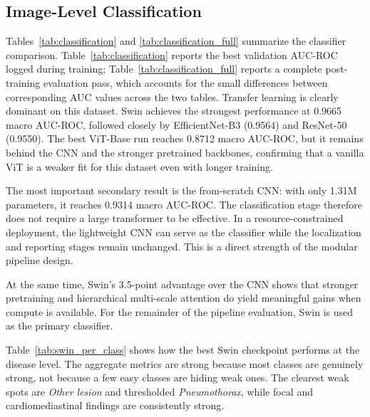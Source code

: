 \documentclass[conference]{IEEEtran}
\begin{document}
\subsection{Image-Level Classification}
Tables~\ref{tab:classification} and \ref{tab:classification_full} summarize the classifier comparison. Table~\ref{tab:classification} reports the best validation AUC-ROC logged during training; Table~\ref{tab:classification_full} reports a complete post-training evaluation pass, which accounts for the small differences between corresponding AUC values across the two tables. Transfer learning is clearly dominant on this dataset. Swin achieves the strongest performance at 0.9665 macro AUC-ROC, followed closely by EfficientNet-B3 (0.9564) and ResNet-50 (0.9550). The best ViT-Base run reaches 0.8712 macro AUC-ROC, but it remains behind the CNN and the stronger pretrained backbones, confirming that a vanilla ViT is a weaker fit for this dataset even with longer training.

The most important secondary result is the from-scratch CNN: with only 1.31M parameters, it reaches 0.9314 macro AUC-ROC. The classification stage therefore does not require a large transformer to be effective. In a resource-constrained deployment, the lightweight CNN can serve as the classifier while the localization and reporting stages remain unchanged. This is a direct strength of the modular pipeline design.

At the same time, Swin's 3.5-point advantage over the CNN shows that stronger pretraining and hierarchical multi-scale attention do yield meaningful gains when compute is available. For the remainder of the pipeline evaluation, Swin is used as the primary classifier.

Table~\ref{tab:swin_per_class} shows how the best Swin checkpoint performs at the disease level. The aggregate metrics are strong because most classes are genuinely strong, not because a few easy classes are hiding weak ones. The clearest weak spots are \textit{Other lesion} and thresholded \textit{Pneumothorax}, while focal and cardiomediastinal findings are consistently strong.
\end{document}

